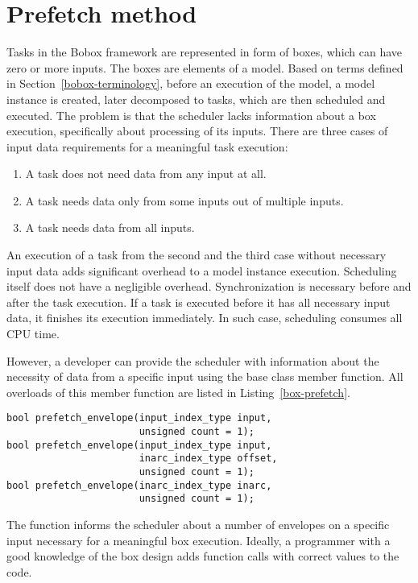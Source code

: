 \chapter{Prefetch method}
\label{prefetch}
Tasks in the Bobox framework are represented in form of boxes, which can have zero or more inputs. The boxes are elements of a model. Based on terms defined in Section~\ref{bobox-terminology}, before an execution of the model, a model instance is created, later decomposed to tasks, which are then scheduled and executed. The problem is that the scheduler lacks information about a box execution, specifically about processing of its inputs. There are three cases of input data requirements for a meaningful task execution:

\begin{enumerate}
\item A task does not need data from any input at all.
\item A task needs data only from some inputs out of multiple inputs.
\item A task needs data from all inputs.
\end{enumerate}

An execution of a task from the second and the third case without necessary input data adds significant overhead to a model instance execution. Scheduling itself does not have a negligible overhead. Synchronization is necessary before and after the task execution. If a task is executed before it has all necessary input data, it finishes its execution immediately. In such case, scheduling consumes all CPU time.

However, a developer can provide the scheduler with information about the necessity of data from a specific input using the  base class member function. All overloads of this member function are listed in Listing~\ref{box-prefetch}.

\begin{lstlisting}[caption={\code{basic\_box} prefetch member function overloads.},label={box-prefetch}]
bool prefetch_envelope(input_index_type input,
                       unsigned count = 1);
bool prefetch_envelope(input_index_type input,
                       inarc_index_type offset,
                       unsigned count = 1);
bool prefetch_envelope(inarc_index_type inarc,
                       unsigned count = 1);
\end{lstlisting}

The function informs the scheduler about a number of envelopes on a specific input necessary for a meaningful box execution. Ideally, a programmer with a good knowledge of the box design adds function calls with correct values to the code.

